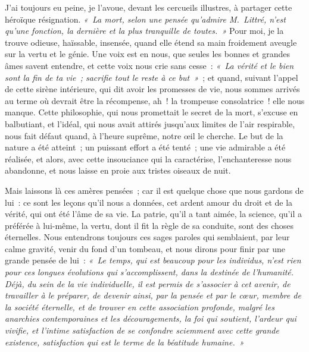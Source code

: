 \documentclass[french,twoside]{book} %
\newcommand\persName[1]{#1}
\begin{document}
J’ai toujours eu peine, je l’avoue, devant les cercueils illustres, à partager cette héroïque résignation. \emph{« La mort, selon une pensée qu’admire {\persName M. Littré}, n’est qu’une fonction, la dernière et la plus tranquille de toutes. »} Pour moi, je la trouve odieuse, haïssable, insensée, quand elle étend sa main froidement aveugle sur la vertu et le génie. Une voix est en nous, que seules les bonnes et grandes âmes savent entendre, et cette voix nous crie sans cesse : \emph{« La vérité et le bien sont la fin de ta vie ; sacrifie tout le reste à ce but »} ; et quand, suivant l’appel de cette sirène intérieure, qui dit avoir les promesses de vie, nous sommes arrivés au terme où devrait être la récompense, ah ! la trompeuse consolatrice ! elle nous manque. Cette philosophie, qui nous promettait le secret de la mort, s’excuse en balbutiant, et l’idéal, qui nous avait attirés jusqu’aux limites de l’air respirable, nous fait défaut quand, à l’heure suprême, notre œil le cherche. Le but de la nature a été atteint ; un puissant effort a été tenté ; une vie admirable a été réalisée, et alors, avec cette insouciance qui la caractérise, l’enchanteresse nous abandonne, et nous laisse en proie aux tristes oiseaux de nuit.\par
Mais laissons là ces amères pensées ; car il est quelque chose que nous gardons de lui : ce sont les leçons qu’il nous a données, cet ardent amour du droit et de la vérité, qui ont été l’âme de sa vie. La patrie, qu’il a tant aimée, la science, qu’il a préférée à lui-même, la vertu, dont il fit la règle de sa conduite, sont des choses éternelles. Nous entendrons toujours ces sages paroles qui semblaient, par leur calme gravité, venir du fond d’un tombeau, et nous dirons pour finir par une grande pensée de lui : \emph{« Le temps, qui est beaucoup pour les individus, n’est rien pour ces longues évolutions qui s’accomplissent, dans la destinée de l’humanité. Déjà, du sein de la vie individuelle, il est permis de s’associer à cet avenir, de travailler à le préparer, de devenir ainsi, par la pensée et par le cœur, membre de la société éternelle, et de trouver en cette association profonde, malgré les anarchies contemporaines et les découragements, la foi qui soutient, l’ardeur qui vivifie, et l’intime satisfaction de se confondre sciemment avec cette grande existence, satisfaction qui est le terme de la béatitude humaine. »}\par
\end{document}
